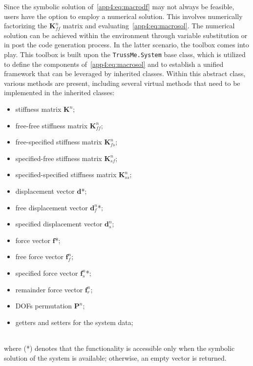 Since the symbolic solution of~\eqref{app4:eq:macrodf} may not always be feasible, users have the option to employ a numerical solution. This involves numerically factorizing the $\mathbf{K}^{n}_{ff}$ matrix and evaluating~\eqref{app4:eq:macrosol}. The numerical solution can be achieved within the \Maple{} environment through variable substitution or in \Matlab{} post the code generation process. In the latter scenario, the \TrussMe{} \Matlab{} toolbox comes into play. This toolbox is built upon the \texttt{TrussMe.System} base class, which is utilized to define the components of~\eqref{app4:eq:macrosol} and to establish a unified framework that can be leveraged by inherited classes. Within this abstract class, various methods are present, including several virtual methods that need to be implemented in the inherited classes: \\[0.5em]
%
\begin{minipage}[t]{0.49\textwidth}
  \begin{itemize}
  \setlength{\itemsep}{-0.25em}
  \item stiffness matrix $\mathbf{K}^{n}$;
  \item free-free stiffness matrix $\mathbf{K}^{n}_{ff}$;
  \item free-specified stiffness matrix $\mathbf{K}^{n}_{fs}$;
  \item specified-free stiffness matrix $\mathbf{K}^{n}_{sf}$;
  \item specified-specified stiffness matrix $\mathbf{K}^{n}_{ss}$;
  \item displacement vector $\mathbf{d}$*;
  \item free displacement vector $\mathbf{d}^{n}_{f}$*;
  \end{itemize}
\end{minipage}
\hfill
\begin{minipage}[t]{0.49\textwidth}
  \begin{itemize}
  \setlength{\itemsep}{-0.25em}
  \item specified displacement vector $\mathbf{d}^{n}_{s}$;
  \item force vector $\mathbf{f}$*;
  \item free force vector $\mathbf{f}^{n}_{f}$;
  \item specified force vector $\mathbf{f}^{n}_{s}$*;
  \item remainder force vector $\mathbf{f}^{n}_{r}$;
  \item \acp{DOF} permutation $\mathbf{P}^{n}$;
  \item getters and setters for the system data;
  \end{itemize}
\end{minipage} \\[0.5em]
%
where (*) denotes that the functionality is accessible only when the symbolic solution of the system is available; otherwise, an empty vector is returned.

